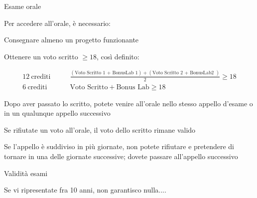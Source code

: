 \begin{frame}{Esame orale}

Per accedere all'orale, è necessario:
\BIL
\item Consegnare almeno un progetto funzionante 
\item Ottenere un voto scritto ${} \geq 18$, così definito:

\begingroup
\tiny
\begin{align*}
  \mathrm{12\ crediti} & \qquad \frac{(\textrm{Voto Scritto 1 + BonusLab 1}) + (\textrm{Voto Scritto 2 + BonusLab2 })}{2} \geq 18 \\
  \mathrm{6\ crediti} & \qquad \textrm{Voto Scritto} + \textrm{Bonus Lab} \geq 18 
\end{align*}
\endgroup

\item Dopo aver passato lo scritto, potete venire all'orale nello stesso appello d'esame o in un qualunque appello successivo
\item Se rifiutate un voto all’orale, il voto dello scritto rimane valido
\item Se l'appello è suddiviso in più giornate, non potete rifiutare e pretendere di tornare in una delle giornate successive; dovete passare all'appello successivo
\EIL
\end{frame}

\begin{frame}{Validità esami}

\vspace{-9pt}

\medskip
{}

\medskip
{}
\BI
\item Se vi ripresentate fra 10 anni, non garantisco nulla....
\EI

\end{frame}


